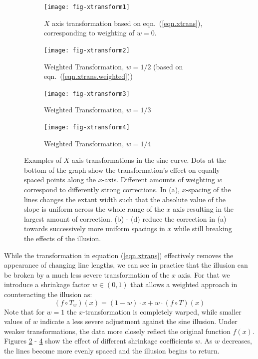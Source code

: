 \documentclass[11pt]{isuthesis}\usepackage[]{graphicx}\usepackage[]{color}
\begin{document}
\begin{figure}[h!tbp]\centering
\begin{subfigure}[b]{.45\textwidth}\centering 
\texttt{[image: fig-xtransform1]}
\caption[$X$ axis transformation]{$X$ axis transformation based on eqn.~(\ref{eqn.xtrans}), corresponding to weighting of $w=0$.}
\label{fig:xtrans1}
\end{subfigure} \hfill\hfill
\begin{subfigure}[b]{.45\textwidth}\centering
\texttt{[image: fig-xtransform2]} 
\caption[Weighted transformation]{Weighted Transformation, $w=1/2$ (based on eqn.~(\ref{eqn.xtrans.weighted}))}
\label{fig:xtrans2}
\end{subfigure}

\begin{subfigure}[b]{.45\textwidth}\centering 
\texttt{[image: fig-xtransform3]}
\caption[Weighted transformation]{Weighted Transformation, $w=1/3$}
\label{fig:xtrans3}
\end{subfigure} \hfill
\begin{subfigure}[b]{.45\textwidth}\centering
\texttt{[image: fig-xtransform4]}
\caption[Weighted transformation]{Weighted Transformation, $w=1/4$}
\label{fig:xtrans4}
\end{subfigure}
\caption[X axis transformations]{Examples of $X$ axis transformations in the sine curve.  Dots at the bottom of the graph show the transformation's effect on equally spaced points along the $x$-axis. Different amounts of weighting $w$ correspond to differently strong corrections. In (a),   $x$-spacing of the lines changes the extant width such that the absolute value of the slope is uniform across the whole range of the $x$ axis resulting in the largest amount of correction.  (b) - (d) reduce the correction in (a) towards successively more uniform spacings in $x$ while still breaking the effects of the illusion.}
\label{fig:xtrans}
\end{figure}
While the transformation in equation (\ref{eqn.xtrans}) effectively removes the appearance of changing line lengths, we can see in practice that the illusion can be broken by a much less severe transformation of the $x$ axis. 
For that we introduce a shrinkage factor $w \in (0,1)$ that allows a weighted approach in counteracting the illusion as: 
%
\begin{equation}\label{eqn.xtrans.weighted}
(f \circ T_w)(x) = (1-w) \cdot x + w \cdot (f \circ T)(x)
\end{equation}
%
Note that for $w=1$ the $x$-transformation is completely warped, while smaller values of $w$ indicate a less severe adjustment against the sine illusion.  Under  weaker transformations, the data more closely reflect the original function $f(x)$. 
Figures \ref{fig:xtrans2} - \ref{fig:xtrans4} show the effect of different shrinkage coefficients $w$. As $w$ decreases, the lines become more evenly spaced and the illusion begins to return. 
\end{document}
